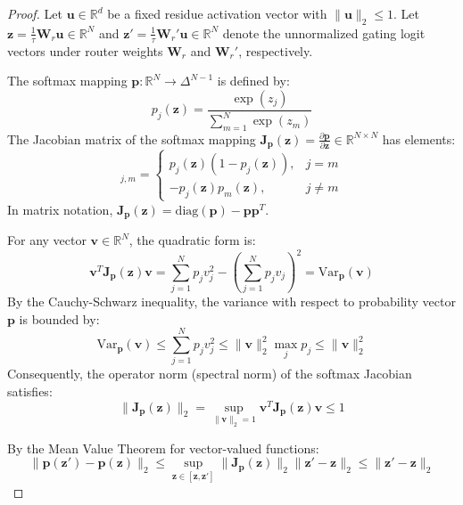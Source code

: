 \documentclass{article}
\theoremstyle{definition}
\begin{document}
\begin{proof}
Let $\mathbf{u} \in \mathbb{R}^d$ be a fixed residue activation vector with $\|\mathbf{u}\|_2 \le 1$. Let $\mathbf{z} = \frac{1}{\tau} \mathbf{W}_r \mathbf{u} \in \mathbb{R}^N$ and $\mathbf{z}' = \frac{1}{\tau} \mathbf{W}_r' \mathbf{u} \in \mathbb{R}^N$ denote the unnormalized gating logit vectors under router weights $\mathbf{W}_r$ and $\mathbf{W}_r'$, respectively.

The softmax mapping $\mathbf{p}: \mathbb{R}^N \to \Delta^{N-1}$ is defined by:
\begin{equation}
p_j(\mathbf{z}) = \frac{\exp(z_j)}{\sum_{m=1}^N \exp(z_m)}
\end{equation}
The Jacobian matrix of the softmax mapping $\mathbf{J}_{\mathbf{p}}(\mathbf{z}) = \frac{\partial \mathbf{p}}{\partial \mathbf{z}} \in \mathbb{R}^{N \times N}$ has elements:
\begin{equation}
[\mathbf{J}_{\mathbf{p}}(\mathbf{z})]_{j, m} = \begin{cases} p_j(\mathbf{z})(1 - p_j(\mathbf{z})), & j = m \\ -p_j(\mathbf{z}) p_m(\mathbf{z}), & j \neq m \end{cases}
\end{equation}
In matrix notation, $\mathbf{J}_{\mathbf{p}}(\mathbf{z}) = \text{diag}(\mathbf{p}) - \mathbf{p} \mathbf{p}^T$.

For any vector $\mathbf{v} \in \mathbb{R}^N$, the quadratic form is:
\begin{equation}
\mathbf{v}^T \mathbf{J}_{\mathbf{p}}(\mathbf{z}) \mathbf{v} = \sum_{j=1}^N p_j v_j^2 - \left(\sum_{j=1}^N p_j v_j\right)^2 = \text{Var}_{\mathbf{p}}(\mathbf{v})
\end{equation}
By the Cauchy-Schwarz inequality, the variance with respect to probability vector $\mathbf{p}$ is bounded by:
\begin{equation}
\text{Var}_{\mathbf{p}}(\mathbf{v}) \le \sum_{j=1}^N p_j v_j^2 \le \|\mathbf{v}\|_2^2 \max_{j} p_j \le \|\mathbf{v}\|_2^2
\end{equation}
Consequently, the operator norm (spectral norm) of the softmax Jacobian satisfies:
\begin{equation}
\|\mathbf{J}_{\mathbf{p}}(\mathbf{z})\|_2 = \sup_{\|\mathbf{v}\|_2 = 1} \mathbf{v}^T \mathbf{J}_{\mathbf{p}}(\mathbf{z}) \mathbf{v} \le 1
\end{equation}

By the Mean Value Theorem for vector-valued functions:
\begin{equation}
\|\mathbf{p}(\mathbf{z}') - \mathbf{p}(\mathbf{z})\|_2 \le \sup_{\mathbf{z} \in [\mathbf{z}, \mathbf{z}']} \|\mathbf{J}_{\mathbf{p}}(\mathbf{z})\|_2 \|\mathbf{z}' - \mathbf{z}\|_2 \le \|\mathbf{z}' - \mathbf{z}\|_2
\end{equation}


\end{proof}
\end{document}

